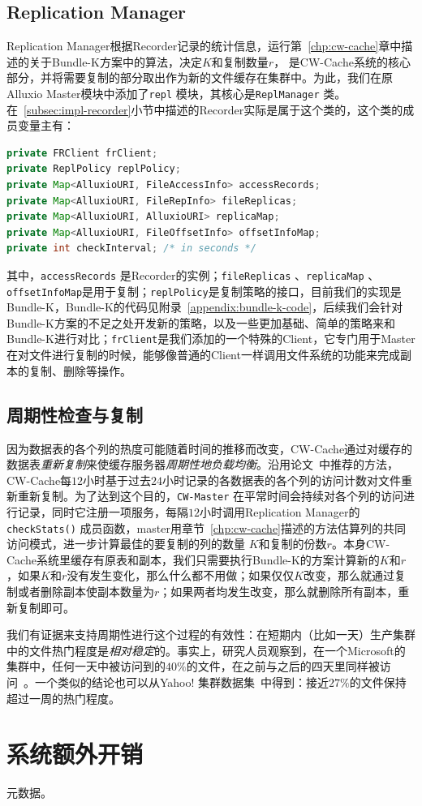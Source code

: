 \subsection{Replication Manager}

\par Replication Manager根据Recorder记录的统计信息，运行第~\ref{chp:cw-cache}章中描述的关于Bundle-K方案中的算法，决定$K$和复制数量$r$， 是CW-Cache系统的核心部分，并将需要复制的部分取出作为新的文件缓存在集群中。为此，我们在原Alluxio Master模块中添加了\verb|repl| 模块，其核心是\verb|ReplManager| 类。在~\ref{subsec:impl-recorder}小节中描述的Recorder实际是属于这个类的，这个类的成员变量主有：

\begin{lstlisting}[language=java]
private FRClient frClient;
private ReplPolicy replPolicy;
private Map<AlluxioURI, FileAccessInfo> accessRecords;
private Map<AlluxioURI, FileRepInfo> fileReplicas;
private Map<AlluxioURI, AlluxioURI> replicaMap;
private Map<AlluxioURI, FileOffsetInfo> offsetInfoMap;
private int checkInterval; /* in seconds */
\end{lstlisting}

\par 其中，\verb|accessRecords| 是Recorder的实例；\verb|fileReplicas| 、\verb|replicaMap| 、\verb|offsetInfoMap|是用于复制；\verb|replPolicy|是复制策略的接口，目前我们的实现是Bundle-K，Bundle-K的代码见附录~\ref{appendix:bundle-k-code}，后续我们会针对Bundle-K方案的不足之处开发新的策略，以及一些更加基础、简单的策略来和Bundle-K进行对比；\verb|frClient|是我们添加的一个特殊的Client，它专门用于Master在对文件进行复制的时候，能够像普通的Client一样调用文件系统的功能来完成副本的复制、删除等操作。

\subsection{周期性检查与复制}

\par 因为数据表的各个列的热度可能随着时间的推移而改变，CW-Cache通过对缓存的数据表\emph{重新复制}来使缓存服务器\emph{周期性地负载均衡}。沿用论文~\cite{ananthanarayanan2011scarlett}中推荐的方法，CW-Cache每$12$小时基于过去$24$小时记录的各数据表的各个列的访问计数对文件重新重新复制。为了达到这个目的，\texttt{CW-Master} 在平常时间会持续对各个列的访问进行记录，同时它注册一项服务，每隔$12$小时调用Replication Manager的\texttt{checkStats()} 成员函数，master用章节~\ref{chp:cw-cache}描述的方法估算列的共同访问模式，进一步计算最佳的要复制的列的数量 $K$和复制的份数$r$。本身CW-Cache系统里缓存有原表和副本，我们只需要执行Bundle-K的方案计算新的$K$和$r$，如果$K$和$r$没有发生变化，那么什么都不用做；如果仅仅$K$改变，那么就通过复制或者删除副本使副本数量为$r$；如果两者均发生改变，那么就删除所有副本，重新复制即可。

\par 我们有证据来支持周期性进行这个过程的有效性：在短期内（比如一天）生产集群中的文件热门程度是\emph{相对稳定}的。事实上，研究人员观察到，在一个Microsoft的集群中，任何一天中被访问到的$40\%$的文件，在之前与之后的四天里同样被访问~\cite{ananthanarayanan2011scarlett}。一个类似的结论也可以从Yahoo! 集群数据集~\cite{yahoo!_trace}中得到：接近$27\%$的文件保持超过一周的热门程度。


\section{系统额外开销}

\par 元数据。
